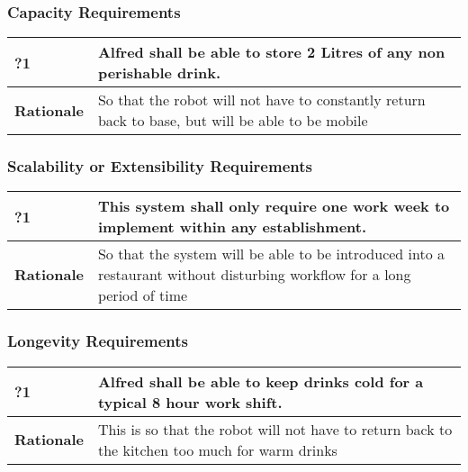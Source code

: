 \documentclass [11pt]{article}
\begin{document}
\subsubsection{Capacity Requirements }

\begin{longtable}{| p{ } | p{ } | }\hline 
	\rowcolor{tableCell}\textbf{?1} &  Alfred shall be able to store 2 Litres of any non perishable drink. \\ \hline
	\textbf{Rationale} & So that the robot will not have to constantly return back to base, but will be able to be mobile\\ \hline 
\end{longtable}
\subsubsection{Scalability or Extensibility Requirements }

\begin{longtable}{| p{ } | p{ } | }\hline 
	\rowcolor{tableCell}\textbf{?1} &  This system shall only require one work week to implement within any establishment. \\ \hline
	\textbf{Rationale} & So that the system will be able to be introduced into a restaurant without disturbing workflow for a long period of time\\ \hline 
\end{longtable}
\subsubsection{Longevity Requirements }

\begin{longtable}{| p{ } | p{ } | }\hline 
	\rowcolor{tableCell}\textbf{?1} &  Alfred shall be able to keep drinks cold for a typical 8 hour work shift. \\ \hline
	\textbf{Rationale} & This is so that the robot will not have to return back to the kitchen too much for warm drinks\\ \hline 
\end{longtable}
\end{document}
